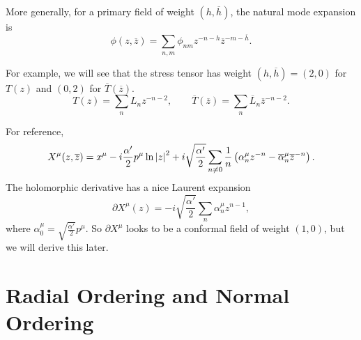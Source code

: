 More generally, for a primary field of weight $(h, \overline{h}{})$, the natural mode expansion is
\begin{equation}
  \boxed{\phi(z, \overline{z}{}) = \sum_{n, m} \phi_{nm} z^{-n-h} \overline{z}{}^{-m-\overline{h}{}}}.
\end{equation}
\begin{example}[]
  For example, we will see that the stress tensor has weight $(h, \overline{h}{}) = (2, 0)$ for $T(z)$ and $(0,2)$ for $\overline{T}{}(\overline{z}{})$.
  \begin{equation}
    T(z) = \sum_{n} L_n z^{-n - 2}, \qquad
    \overline{T}{}(\overline{z}{}) = \sum_{n} \overline{L}{}_n \overline{z}{}^{-n-2}.
  \end{equation}
\end{example}
\begin{example}[]
  For reference, 
  \begin{equation}
    X^{\mu}(z, \overline{z}{}) = x^{\mu} - i\frac{ \alpha'}{2} p^{\mu} \ln \abs{z}^2 + i \sqrt{\frac{\alpha'}{2}} \sum_{n \neq 0} \frac{1}{n} \left( \alpha_n^{\mu} z^{-n} - \overline{\alpha}{}^{\mu}_n \overline{z}{}^{-n} \right).
  \end{equation}
  The holomorphic derivative has a nice Laurent expansion
  \begin{equation}
    \partial X^{\mu}(z) = -i \sqrt{\frac{\alpha'}{2}} \sum_{n} \alpha^{\mu}_n z^{n-1}, 
  \end{equation}
  where $\alpha_0^{\mu} = \sqrt{\frac{\alpha'}{2}} p^{\mu}$. So $\partial X^{\mu}$ looks to be a conformal field of weight $(1, 0)$, but we will derive this later.
\end{example}

\section{Radial Ordering and Normal Ordering}%
\label{sec:radial_ordering_and_normal_ordering}

